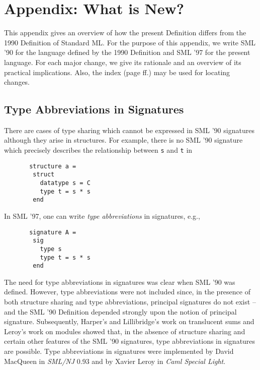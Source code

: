 %
%

%
%
\section{Appendix: What is New?}
\label{whatisnew-app}
This appendix gives an overview of how the present Definition
differs from the 1990 Definition of Standard ML\cite{mth90}. 
For the purpose of this appendix, we write SML '90 for the 
language defined by the 1990 Definition and SML '97 for the
present language. 
For each major change, we give its rationale and an overview
of its practical implications. Also, the index
(page \pageref{index-sec} ff.) may be used for locating changes.


\subsection{Type Abbreviations in Signatures}
\label{typabbr.sec}
There are cases of type sharing which cannot be expressed
in SML '90 signatures although they arise in structures. For example,
there is no SML '90 signature which precisely describes the relationship
between {\tt s} and {\tt t} in
\begin{verbatim}
       structure a =
        struct
          datatype s = C 
          type t = s * s
        end
\end{verbatim}
In SML '97, one can write {\sl type abbreviations} in signatures, e.g.,
\begin{verbatim}
       signature A =
        sig
          type s 
          type t = s * s
        end
\end{verbatim}
The need for type abbreviations in signatures was clear when SML '90 was 
defined. However, type abbreviations were not included since, in the 
presence of both structure sharing and type abbreviations, principal 
signatures do not exist\cite{mt91} -- and the SML '90 Definition 
depended strongly upon the notion of principal signature.
Subsequently, Harper's and Lillibridge's work on translucent sums\cite{hl94} 
and Leroy's work on modules\cite{leroy94} showed that, in the absence of 
structure sharing and certain other features of the SML '90 signatures, 
type abbreviations in signatures are possible. 
Type abbreviations in signatures were implemented by 
David MacQueen in {\em SML/NJ} 0.93 and by Xavier Leroy in
{\em Caml Special Light\/}\cite{Caml-Special-Light}.

